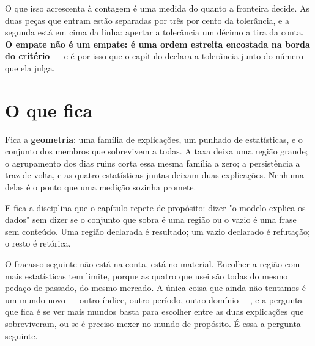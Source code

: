 O que isso acrescenta à contagem é uma medida do quanto a fronteira decide. As duas peças que entram
estão separadas por três por cento da tolerância, e a segunda está em cima da linha: apertar a
tolerância um décimo a tira da conta. \textbf{O empate não é um empate: é uma ordem estreita
encostada na borda do critério} --- e é por isso que o capítulo declara a tolerância junto do número
que ela julga.

\section{O que fica}

Fica a \textbf{geometria}: uma família de explicações, um punhado de estatísticas, e o conjunto
dos membros que sobrevivem a todas. A taxa deixa uma região grande; o agrupamento dos dias ruins
corta essa mesma família a zero; a persistência a traz de volta, e as quatro estatísticas juntas
deixam duas explicações. Nenhuma delas é o ponto que uma medição sozinha promete.

E fica a disciplina que o capítulo repete de propósito: dizer "o modelo explica os dados" sem
dizer se o conjunto que sobra é uma região ou o vazio é uma frase sem conteúdo. Uma região
declarada é resultado; um vazio declarado é refutação; o resto é retórica\cite{ioannidis2005most}.

O fracasso seguinte não está na conta, está no material. Encolher a região com mais estatísticas
tem limite, porque as quatro que usei são todas do mesmo pedaço de passado, do mesmo mercado. A
única coisa que ainda não tentamos é um mundo novo --- outro índice, outro período, outro
domínio ---, e a pergunta que fica é se ver mais mundos basta para escolher entre as duas
explicações que sobreviveram, ou se é preciso mexer no mundo de propósito. É essa a pergunta seguinte.
